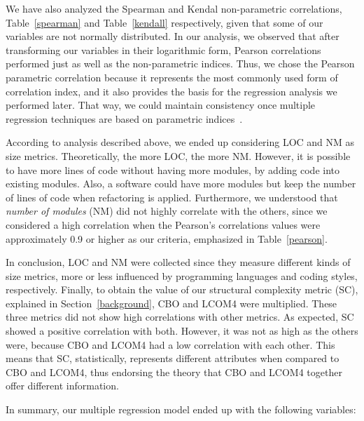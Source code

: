 \documentclass[conference]{IEEEtran}
\begin{document}
We have also analyzed the Spearman and Kendal non-parametric correlations,
Table~\ref{spearman} and Table~\ref{kendall} respectively, given that some of
our variables are not normally distributed. 
%
In our analysis, we observed that after transforming our variables in their logarithmic form, 
Pearson correlations performed just as well as the non-parametric indices.
%
Thus, we chose the Pearson parametric correlation because it represents the most 
commonly used form of correlation index, and it also provides the basis for the 
regression analysis we performed later. That way, we could maintain
consistency once multiple regression techniques are based on
parametric indices~\cite{hair2006}.

According to analysis described above, we ended up considering LOC and NM 
as size metrics. Theoretically, the more LOC, the more NM.
%
However, it is possible to have more lines of code without having more modules, by
adding code into existing modules. Also, a software could have more modules
but keep the number of lines of code when refactoring is applied.
%
Furthermore, we understood that \emph{number of modules} (NM) did not highly
correlate with the others, since we considered a high correlation when the
Pearson's correlations values were approximately 0.9 or higher as our criteria,
emphasized in Table~\ref{pearson}.

%
In conclusion, LOC and NM were collected since they measure different kinds of size metrics, more or less
influenced by programming languages and coding styles, respectively.
%
Finally, to obtain the value of our structural
complexity metric (SC), explained in Section~\ref{background}, CBO and LCOM4 were multiplied.
%
These three metrics did not show high correlations with other metrics.
%
As expected, SC showed a positive correlation with both. However, it was not 
as high as the others were, because CBO and LCOM4 had a low correlation
with each other. This means that SC, statistically, represents different attributes
when compared to CBO and LCOM4, thus endorsing  the theory that CBO and LCOM4 together
offer different information. 

In summary, our multiple regression model ended up with the following variables:
\end{document}

